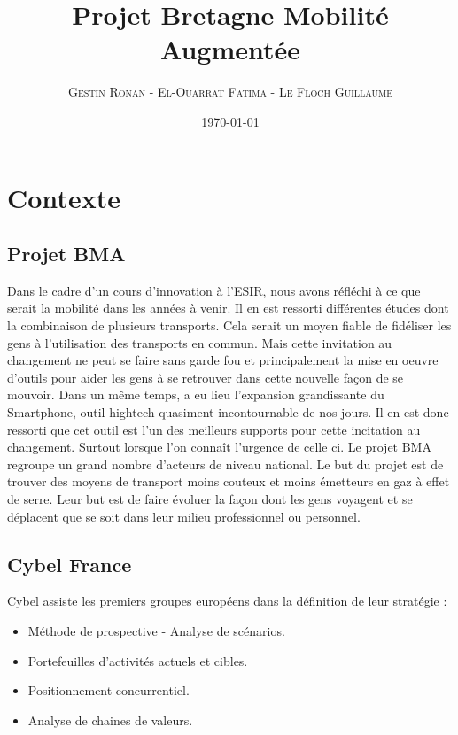 \documentclass[twocolumn]{article}   		%
\title{Projet Bretagne Mobilit\'e Augment\'ee}
\author{\textsc{Gestin Ronan} - \textsc{El-Ouarrat Fatima} - \textsc{Le Floch Guillaume}}
\date{\today}
\begin{document}
\maketitle            					%

\newpage		
\clearpage						%


\newpage							%

\section{Contexte}

	\subsection{Projet BMA}
	Dans le cadre d'un cours d'innovation \`a l'ESIR, nous avons r\'efl\'echi \`a ce que serait la mobilit\'e dans les ann\'ees \`a venir. Il en est ressorti diff\'erentes \'etudes dont la combinaison de plusieurs transports. Cela serait un moyen fiable de fid\'eliser les gens \`a l'utilisation des transports en commun. Mais cette invitation au changement ne peut se faire sans garde fou et principalement la mise en oeuvre d'outils pour aider les gens \`a se retrouver dans cette nouvelle fa\c con de se mouvoir. Dans un m\^eme temps, a eu lieu l'expansion grandissante du Smartphone, outil hightech quasiment incontournable de nos jours. Il en est donc ressorti que cet outil est l'un des meilleurs supports pour cette incitation au changement. Surtout lorsque l'on conna\^it l'urgence de celle ci. Le projet BMA regroupe un grand nombre d'acteurs de niveau national. Le but du projet est de trouver des moyens de transport moins couteux et moins \'emetteurs en gaz \`a effet de serre. Leur but est de faire \'evoluer la fa\c con dont les gens voyagent et se d\'eplacent que se soit dans leur milieu professionnel ou personnel.	
	\subsection{Cybel France}
	Cybel assiste les premiers groupes europ\'eens dans la d\'efinition de leur strat\'egie :
	
	\begin{itemize}
		\renewcommand{\labelitemi}{$\bullet$}
		\item M\'ethode de prospective - Analyse de sc\'enarios.
		\item Portefeuilles d'activit\'es actuels et cibles.
		\item Positionnement concurrentiel.
		\item Analyse de chaines de valeurs.
	\end{itemize}	
\end{document}
